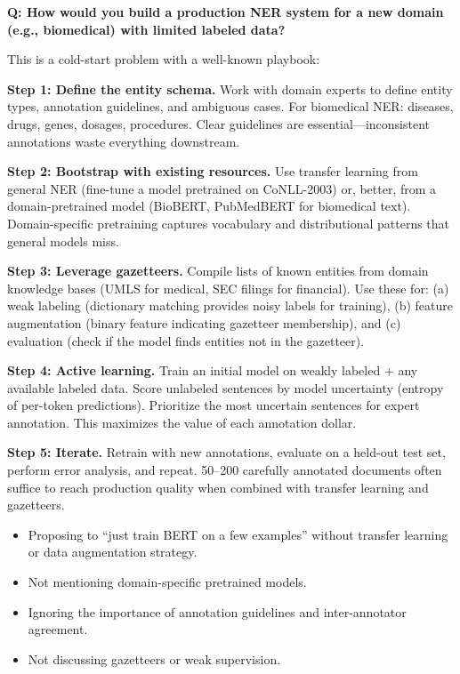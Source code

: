 \begin{interviewq}
\textbf{Q: How would you build a production NER system for a new domain (e.g., biomedical)
with limited labeled data?}

 \quad {} \quad \badgefreq{\freqhigh}

\stronganswer
This is a cold-start problem with a well-known playbook:

\textbf{Step 1: Define the entity schema.}  Work with domain experts to define entity types,
annotation guidelines, and ambiguous cases.  For biomedical NER: diseases, drugs, genes,
dosages, procedures.  Clear guidelines are essential---inconsistent annotations waste
everything downstream.

\textbf{Step 2: Bootstrap with existing resources.}  Use transfer learning from general NER
(fine-tune a model pretrained on CoNLL-2003) or, better, from a domain-pretrained model
(BioBERT, PubMedBERT for biomedical text).  Domain-specific pretraining captures vocabulary
and distributional patterns that general models miss.

\textbf{Step 3: Leverage gazetteers.}  Compile lists of known entities from domain knowledge
bases (UMLS for medical, SEC filings for financial).  Use these for: (a) weak labeling
(dictionary matching provides noisy labels for training), (b) feature augmentation (binary
feature indicating gazetteer membership), and (c) evaluation (check if the model finds
entities not in the gazetteer).

\textbf{Step 4: Active learning.}  Train an initial model on weakly labeled + any available
labeled data.  Score unlabeled sentences by model uncertainty (entropy of per-token
predictions).  Prioritize the most uncertain sentences for expert annotation.  This
maximizes the value of each annotation dollar.

\textbf{Step 5: Iterate.}  Retrain with new annotations, evaluate on a held-out test set,
perform error analysis, and repeat.  50--200 carefully annotated documents often suffice to
reach production quality when combined with transfer learning and gazetteers.

\redflags
\begin{itemize}
    \item Proposing to ``just train BERT on a few examples'' without transfer learning or
    data augmentation strategy.
    \item Not mentioning domain-specific pretrained models.
    \item Ignoring the importance of annotation guidelines and inter-annotator agreement.
    \item Not discussing gazetteers or weak supervision.
\end{itemize}


\end{interviewq}
